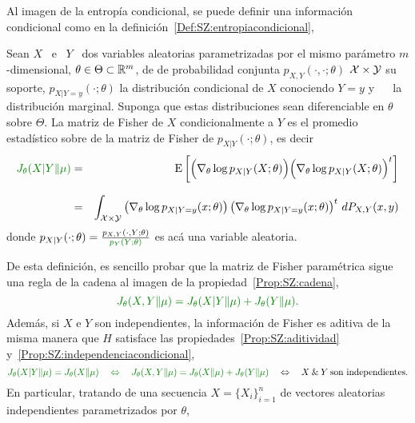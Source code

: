 Al  imagen de  la entrop\'ia  condicional,  se puede  definir una  informaci\'on
condicional como en la definici\'on~\ref{Def:SZ:entropiacondicional},
%
\begin{definicion}
\label{Def:SZ:MatrizFisherParametricaCondicional}
%
Sean  $X$ \  e \  $Y$ \  dos variables  aleatorias parametrizadas  por  el mismo
par\'ametro   $m$-dimensional,  $\theta  \in   \Theta  \subset   \mathbb{R}^m$,  de
  de probabilidad conjunta  $p_{X,Y}(\cdot,\cdot;\theta)$  $\mathcal{X}  \times \mathcal{Y}$  su soporte,
$p_{X|Y=y}(\cdot;\theta)$ la distribuci\'on condicional  de $X$ conociendo $Y=y$
y \   \ la distribuci\'on  marginal. Suponga que estas  distribuciones sean
diferenciable  en  $\theta$   sobre  $\Theta$.  La  matriz  de   Fisher  de  $X$
condicionalmente a $Y$ es el promedio  estad\'istico sobre  de la matriz de
Fisher de $p_{X|Y}(\cdot;\theta)$, es decir
  \begin{eqnarray*}
  \modif{J_\theta(X|Y \| \mu)} & = & \Esp\left[ \Big(  \nabla_\theta \log  p_{X|Y}(X;\theta) \Big)
    \Big( \nabla_\theta \log p_{X|Y}(X;\theta) \Big)^t \right]\\[2.5mm]
    & = & \int_{\X \times \Y} \left( \nabla_\theta \log  p_{X|Y=y}(x;\theta) \right) \left( \nabla_\theta \log  p_{X|Y=y}(x;\theta) \right)^t \, dP_{X,Y}(x,y)
  \end{eqnarray*}
  donde  $p_{X|Y}(\cdot;\theta)   =  \frac{p_{X,Y}(\cdot,Y;\theta)}{\modif{p_Y(Y;\theta)}}$  es
  ac\'a una variable aleatoria.
\end{definicion}

De esta definici\'on,  es sencillo probar que la matriz  de Fisher param\'etrica
sigue una regla de la cadena al imagen de la propiedad~\ref{Prop:SZ:cadena},
%
\[
\modif{J_\theta(X,Y \| \mu) = J_\theta(X|Y \| \mu) + J_\theta(Y \| \mu).}
\]
%
Adem\'as, si $X$ e $Y$ son independientes, la informaci\'on de Fisher es aditiva
de la  misma manera  que $H$ satisface  las propiedades~\ref{Prop:SZ:aditividad}
y~\ref{Prop:SZ:independenciacondicional}, \ie
%
\[
\modif{J_\theta(X|Y \| \mu)  =   J_\theta(X \| \mu)  \quad  \Leftrightarrow  \quad   J_\theta(X,Y \| \mu)  =
J_\theta(X \| \mu) + J_\theta(Y \| \mu)} \quad \Leftrightarrow \quad  X \: \& \: Y \: \mbox{son
independientes.}
\]
%
En particular,  tratando de una  secuencia $X =  \{ X_i \}_{i=1}^n$  de vectores
aleatorias  independientes   parametrizados  por  $\theta$,   

